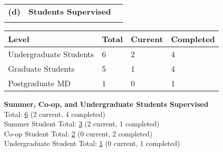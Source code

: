 \documentclass[11pt,notitlepage,english]{report}
\begin{document}

\begin{tabular}{L{.5cm} L{8cm} L{6.9cm}}
  \\
  \textbf{(d)} & \textbf{Students Supervised} \\
  \\
\end{tabular}

\begin{table}[H]
  \label{8d. Students Supervised}
  \centering
  \begin{tabular}{|l|l|l|l|}
    \rowcolor[HTML]{EFEFEF}
    \hline
    Level                  & Total & Current & Completed \\
    \hline
    Undergraduate Students & 6     & 2       & 4         \\
    \hline
    Graduate Students      & 5     & 1       & 4         \\
    \hline
    Postgraduate MD        & 1     & 0       & 1         \\
    \hline
  \end{tabular}
\end{table}

\noindent \textbf{Summer, Co-op, and Undergraduate Students Supervised}
\\

\noindent Total: \underline{6} (2 current, 4 completed) \\
Summer Student Total: \underline{3} (2 current, 1 completed) \\
Co-op Student Total: \underline{2} (0 current, 2 completed) \\
Undergraduate Student Total: \underline{1} (0 current, 1 completed) \\
\end{document}
